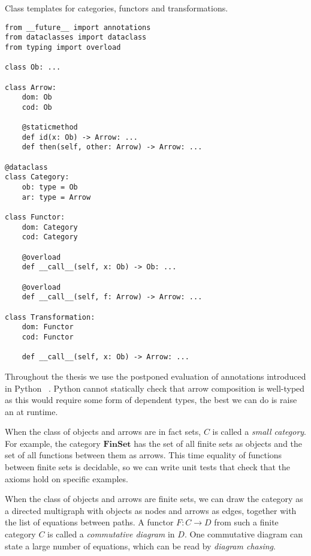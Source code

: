 \begin{python}\label{listing:abstract classes}
{\normalfont Class templates for categories, functors and transformations.}

\begin{verbatim}
from __future__ import annotations
from dataclasses import dataclass
from typing import overload

class Ob: ...

class Arrow:
    dom: Ob
    cod: Ob

    @staticmethod
    def id(x: Ob) -> Arrow: ...
    def then(self, other: Arrow) -> Arrow: ...

@dataclass
class Category:
    ob: type = Ob
    ar: type = Arrow

class Functor:
    dom: Category
    cod: Category

    @overload
    def __call__(self, x: Ob) -> Ob: ...

    @overload
    def __call__(self, f: Arrow) -> Arrow: ...

class Transformation:
    dom: Functor
    cod: Functor

    def __call__(self, x: Ob) -> Arrow: ...
\end{verbatim}
\end{python}

\begin{remark}
Throughout the thesis we use the postponed evaluation of annotations introduced in Python ~\cite{Langa17}.
Python cannot statically check that arrow composition is well-typed as this would require some form of dependent types, the best we can do is raise an  at runtime.
\end{remark}

\begin{example}
When the class of objects and arrows are in fact sets, $C$ is called a \emph{small category}.
For example, the category $\mathbf{FinSet}$ has the set of all finite sets as objects and the set of all functions between them as arrows.
This time equality of functions between finite sets is decidable, so we can write unit tests that check that the axioms hold on specific examples.
\end{example}

\begin{example}
When the class of objects and arrows are finite sets, we can draw the category as a directed multigraph with objects as nodes and arrows as edges, together with the list of equations between paths.
A functor $F : C \to D$ from such a finite category $C$ is called a \emph{commutative diagram} in $D$.
One commutative diagram can state a large number of equations, which can be read by \emph{diagram chasing}.
\end{example}

